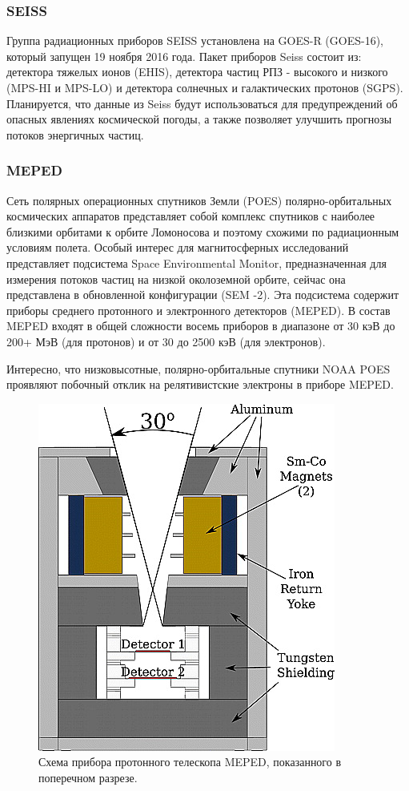 \subsubsection{SEISS}
Группа радиационных приборов SEISS установлена на GOES-R (GOES-16)\cite{Goodman2013}, который запущен 19 ноября 2016 года. 
Пакет приборов Seiss состоит из: детектора тяжелых ионов  (EHIS), детектора частиц РПЗ - высокого и низкого (MPS-HI и MPS-LO) и детектора солнечных и галактических протонов (SGPS). Планируется, что данные из Seiss будут использоваться для предупреждений об опасных явлениях космической погоды, а также позволяет улучшить прогнозы потоков энергичных частиц. 

\subsubsection{MEPED}
Сеть полярных операционных спутников Земли (POES) полярно-орбитальных космических аппаратов представляет собой комплекс спутников с наиболее близкими орбитами к орбите Ломоносова и поэтому схожими по радиационным условиям полета. Особый интерес для магнитосферных исследований представляет подсистема Space Environmental Monitor, предназначенная для измерения потоков частиц на низкой околоземной орбите, сейчас она представлена ​​в обновленной конфигурации (SEM -2). Эта подсистема содержит приборы среднего протонного и электронного детекторов (MEPED).
В состав MEPED входят в общей сложности восемь приборов в диапазоне от 30 кэВ до 200+ МэВ (для протонов) и от 30 до 2500 кэВ (для электронов).

Интересно, что низковысотные, полярно-орбитальные спутники NOAA POES проявляют побочный отклик на релятивистские электроны в приборе MEPED\cite{Yando2011}.
\begin{figure}
	\centering
	\includegraphics[width=0.3\linewidth]{images/jgra21383-fig-0002}
	\caption{Схема прибора протонного телескопа MEPED, показанного в поперечном разрезе.\cite{Yando2011}}
	\label{fig:jgra21383-fig-0002}
\end{figure}


